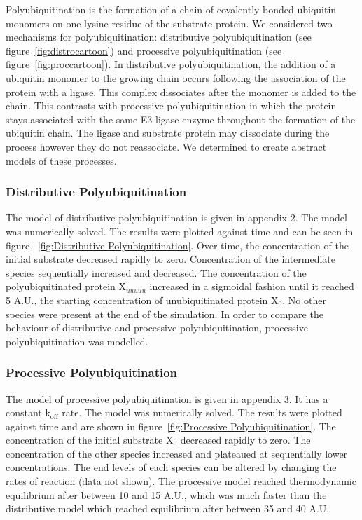 \documentclass[11pt]{article}
\begin{document}
Polyubiquitination is the formation of a chain of covalently bonded ubiquitin monomers on one lysine residue of the substrate protein. We considered two mechanisms for polyubiquitination: distributive polyubiquitination (see figure~\ref{fig:distrocartoon}) and processive polyubiquitination (see figure~\ref{fig:proccartoon}). In distributive polyubiquitination, the addition of a ubiquitin monomer to the growing chain occurs following the association of the protein with a ligase. This complex dissociates after the monomer is added to the chain. This contrasts with processive polyubiquitination in which the protein stays associated with the same E3 ligase enzyme throughout the formation of the ubiquitin chain. The ligase and substrate protein may dissociate during the process however they do not reassociate. We determined to create abstract models of these processes.

\subsubsection{Distributive Polyubiquitination}\label{distro}

The model of distributive polyubiquitination is given in appendix 2. The model was numerically solved. The results were plotted against time and can be seen in figure ~\ref{fig:Distributive Polyubiquitination}. Over time, the concentration of the initial substrate decreased rapidly to zero. Concentration of the intermediate species sequentially increased and decreased. The concentration of the polyubiquitinated protein X$_{uuuuu}$ increased in a sigmoidal fashion until it reached 5 A.U., the starting concentration of unubiquitinated protein X$_0$. No other species were present at the end of the simulation. In order to compare the behaviour of distributive and processive polyubiquitination, processive polyubiquitination was modelled.

\subsubsection{Processive Polyubiquitination}\label{proc}

The model of processive polyubiquitination is given in appendix 3. It has a constant k$_\text{off}$ rate. The model was numerically solved. The results were plotted against time and are shown in figure~\ref{fig:Processive Polyubiquitination}. The concentration of the initial substrate X$_0$ decreased rapidly to zero. The concentration of the other species increased and plateaued at sequentially lower concentrations. The end levels of each species can be altered by changing the rates of reaction (data not shown). The processive model reached thermodynamic equilibrium after between 10 and 15 A.U., which was much faster than the distributive model which reached equilibrium after between 35 and 40 A.U.
\end{document}
